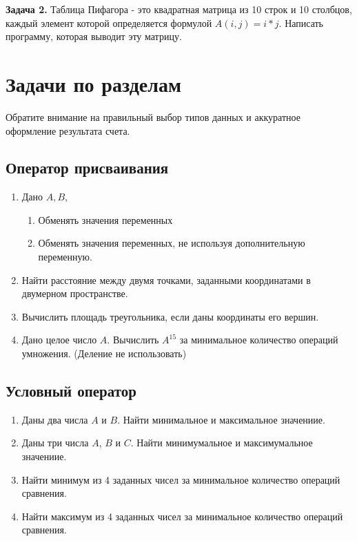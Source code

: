 {\bf Задача 2.}
Таблица Пифагора - это квадратная матрица из 10 строк и 10 столбцов, каждый элемент которой определяется формулой $A(i, j) = i*j.$ 
Написать программу, которая выводит эту матрицу.

\section{Задачи по разделам}

Обратите внимание на правильный выбор типов данных и аккуратное оформление результата счета.

\subsection{Оператор присваивания}

\begin{enumerate}
  \item Дано $A, B$,
    \begin{enumerate}
      \item Обменять значения переменных
      \item Обменять значения переменных, не используя дополнительную переменную.
    \end{enumerate}

  \item Найти расстояние между двумя точками, заданными координатами в двумерном пространстве.

  \item Вычислить площадь треугольника, если даны координаты его вершин.

  \item Дано целое число $A$. Вычислить $A^{15}$ за минимальное количество операций умножения. (Деление не использовать)
\end{enumerate}

\subsection{Условный оператор}

\begin{enumerate}
  \item Даны два числа $A$ и $B$. Найти минимальное и максимальное значениие.

  \item Даны три числа $A$, $B$ и $C$. Найти минимумальное и максимумальное значениие.

  \item Найти минимум из 4 заданных чисел за минимальное количество операций сравнения.

  \item Найти максимум из 4 заданных чисел за минимальное количество операций сравнения.
\end{enumerate}


